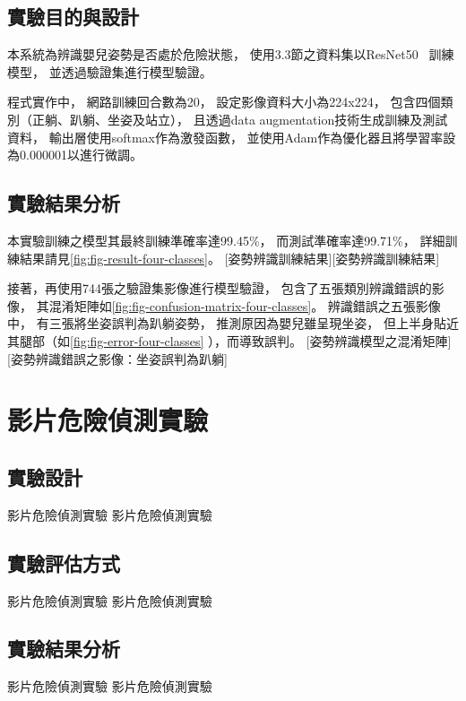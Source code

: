 \documentclass[class=NCU_thesis, crop=false]{standalone}
\begin{document}
\subsection{實驗目的與設計}
本系統為辨識嬰兒姿勢是否處於危險狀態，
使用3.3節之資料集以ResNet50~\cite{he_deep_2016}
訓練模型，
並透過驗證集進行模型驗證。

程式實作中，
網路訓練回合數為20，
設定影像資料大小為224x224，
包含四個類別（正躺、趴躺、坐姿及站立），
且透過data augmentation技術生成訓練及測試資料，
輸出層使用softmax作為激發函數，
並使用Adam作為優化器且將學習率設為0.000001以進行微調。

\subsection{實驗結果分析}
本實驗訓練之模型其最終訓練準確率達99.45\%，
而測試準確率達99.71\%，
詳細訓練結果請見\cref{fig:fig-result-four-classes}。
[姿勢辨識訓練結果][姿勢辨識訓練結果]

接著，再使用744張之驗證集影像進行模型驗證，
包含了五張類別辨識錯誤的影像，
其混淆矩陣如\cref{fig:fig-confusion-matrix-four-classes}。
辨識錯誤之五張影像中，
有三張將坐姿誤判為趴躺姿勢，
推測原因為嬰兒雖呈現坐姿，
但上半身貼近其腿部（如\cref{fig:fig-error-four-classes}
），而導致誤判。
[姿勢辨識模型之混淆矩陣]
[姿勢辨識錯誤之影像：坐姿誤判為趴躺]

\section{影片危險偵測實驗}
\subsection{實驗設計}
影片危險偵測實驗 影片危險偵測實驗

\subsection{實驗評估方式}
影片危險偵測實驗 影片危險偵測實驗

\subsection{實驗結果分析}
影片危險偵測實驗 影片危險偵測實驗
\end{document}
